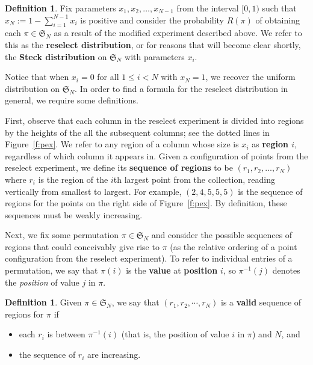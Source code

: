 \documentclass[11pt]{amsart}   %
\theoremstyle{definition}
\newtheorem{definition}[theorem]{Definition}
\theoremstyle{remark}
\numberwithin{equation}{section}
\theoremstyle{theorem}
\renewcommand{\S}{\mathcal{S}}
\renewcommand{\S}{\mathfrak{S}}
\begin{document}
\begin{definition}
Fix parameters $x_1, x_2, \ldots, x_{N-1}$ from the interval $[0, 1)$ such that $x_N := 1-\sum_{i=1}^{N-1} x_i$ is positive and consider the probability $R(\pi)$ of obtaining each $\pi \in \S_N$ as a result of the modified experiment described above.  We refer to this as the {\bf reselect distribution}, or for reasons that will become clear shortly, the {\bf Steck distribution} on $\S_N$ with parameters $x_i$.
\end{definition}

Notice that when $x_i = 0$ for all $1 \leq i < N$ with $x_N = 1$, we recover
the uniform distribution on $\S_N$.  In order to find a formula for the
reselect distribution in general, we require some definitions.

First, observe that each column in the reselect experiment is divided into
regions by the heights of the all the subsequent columns; see the dotted lines
in Figure~\ref{f:pex}.  We refer to any region of a column whose size is
$x_i$ as {\bf region $i$}, regardless of which column it appears in.  Given a
configuration of points from the reselect experiment, we define its {\bf
sequence of regions} to be $(r_1, r_2, \ldots, r_N)$ where $r_i$ is the region
of the $i$th largest point from the collection, reading vertically from
smallest to largest.  For example, $(2, 4, 5, 5, 5)$ is the sequence of regions
for the points on the right side of Figure~\ref{f:pex}.  By definition, these sequences must
be weakly increasing.

Next, we fix some permutation $\pi \in \S_N$ and consider the possible
sequences of regions that could conceivably give rise to $\pi$ (as the relative
ordering of a point configuration from the reselect experiment).  To refer to
individual entries of a permutation, we say that $\pi(i)$ is the {\bf value} at
{\bf position} $i$, so $\pi^{-1}(j)$ denotes the {\em position} of value $j$ in
$\pi$.

\begin{definition}\label{d:vra}
Given $\pi \in \S_N$, we say that $(r_1, r_2, \cdots, r_N)$ is a {\bf valid} sequence of regions for $\pi$ if 
\begin{itemize}
    \item each $r_i$ is between $\pi^{-1}(i)$ (that is, the position of value $i$ in $\pi$) and $N$, and
    \item the sequence of $r_i$ are increasing.
\end{itemize}
\end{definition}
\end{document}
